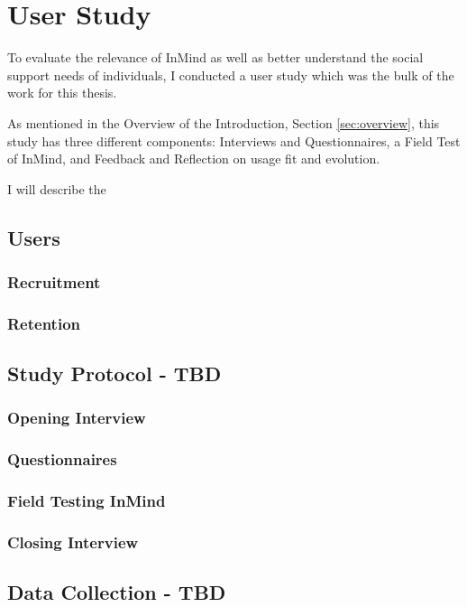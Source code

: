\chapter{User Study}
To evaluate the relevance of InMind as well as better understand
the social support needs of individuals,
I conducted a user study which was the bulk of the work for this thesis.

As mentioned in the Overview of the Introduction,
Section \ref{sec:overview},
this study has three different components:
Interviews and Questionnaires,
a Field Test of InMind,
and
Feedback and Reflection on usage fit and evolution.

I will describe the 

\section{Users}

  \subsection{Recruitment}

  \subsection{Retention}

\section{Study Protocol - TBD}
  \subsection{Opening Interview}

  \subsection{Questionnaires}

  \subsection{Field Testing InMind}

  \subsection{Closing Interview}

\section{Data Collection - TBD}
